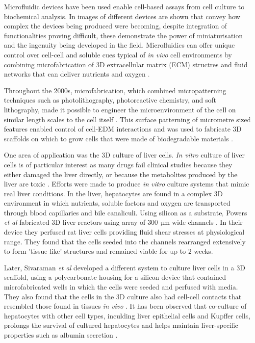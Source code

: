 Microfluidic devices have been used enable cell-based assays from cell culture to biochemical analysis. In
 images of different devices are shown that convey how complex the devices being
produced were becoming, despite integration of functionalities proving difficult, these demonstrate the
power of miniaturisation and the ingenuity being developed in the field.
Microfluidics can offer unique control over cell-cell and soluble cues typical of
\textit{in vivo} cell environments by combining microfabrication of 3D extracellular matrix (ECM)
structres and fluid networks that can deliver nutrients and oxygen \citep{folch1999molding}.

Throughout the 2000s, microfabrication, which combined micropatterning techniques such as
photolithography, photoreactive chemistry, and soft lithography, made it possible to engineer the
microenvironment of the cell on similar length scales to the cell itself \citep{folch2000microengineering}. This surface
patterning of micrometre sized features enabled control of cell-EDM interactions and was used
to fabricate 3D scaffolds on which to grow cells that were made of biodegradable
materials \citep{tsang2004three}.

One area of application was the 3D culture of liver cells. \textit{In vitro} culture
of liver cells is of particular interest as many drugs fail clinical studies because they
either damaged the liver directly, or because the metabolites produced by the liver are toxic
\citep{sivaraman2005microscale}. Efforts were made to produce \textit{in vitro} culture
systems that mimic real liver conditions. In the liver, hepatocytes are found in a complex
3D environment in which nutrients, soluble factors and oxygen are transported through blood
capillaries and bile canaliculi. Using silicon as a substrate, Powers \textit{et al} fabricated
3D liver reactors using array of 300 µm wide channels \citep{powers2002microfabricated}. In their
device they perfused rat liver cells providing fluid shear stresses at physiological range. They found
that the cells seeded into the channels rearranged extensively to form 'tissue like' structures and
remained viable for up to 2 weeks.

Later, Sivaraman \textit{et al} developed a different system to culture liver cells in a 3D scaffold,
using a polycarbonate housing for a silicon device that contained microfabricated wells in which the
cells were seeded and perfused with media. They also found that the cells in the 3D culture
also had cell-cell contacts that resembled those found in tissues \textit{in
vivo} \citep{sivaraman2005microscale}. It has been observed that co-culture of hepatocytes with other cell types,
inculding liver epithelial cells and Kupffer cells, prolongs the survival of cultured hepatocytes and helps maintain
liver-specific properties such as albumin secretion \citep{guguen1983maintenance}.

